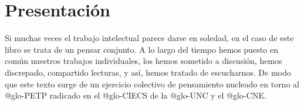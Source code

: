 



\ifPDF

\usepackage[hyphenation,homeoarchy,homeoarchywordcolor=orange, homeoarchycharcolor=orange,draft]{impnattypo}
\usepackage[allcolors=magenta, colorlinks, unicode]{hyperref}
\usepackage{easyReview}
\usepackage{hyperxmp}
\fi

\ifBNPDF

\usepackage[width=18truecm,height=25.5truecm,cam,center]{crop}
\newcommand*\infofont[1]{\sf{\footnotesize #1 (camubattaglia@hotmail.com)}}
\crop[font=infofont]
\usepackage[hidelinks, unicode]{hyperref}
\usepackage{hyperxmp}
\fi

\ifPNGEPUB
\usepackage[hidelinks, unicode]{hyperref}
\fi

\ifHTMLEPUB
\usepackage[allcolors=blue,colorlinks,hyperindex=true,unicode]{hyperref}
\fi



\frontmatter
\maketitle


%
%
%
%
%
%
%
%

\tableofcontents

\chapter{Presentación}

Si muchas veces el trabajo intelectual parece darse en soledad, en el
caso de este libro se trata de un pensar conjunto. A lo largo del tiempo
hemos puesto en común nuestros trabajos individuales, los hemos sometido
a discusión, hemos discrepado, compartido lecturas, y así, hemos tratado
de escucharnos. De modo que este texto surge de un ejercicio colectivo
de pensamiento nucleado en torno al \gls{@glo-PETP} radicado en el \gls{@glo-CIECS} de la \gls{@glo-UNC} y el
\gls{@glo-CNE}.

